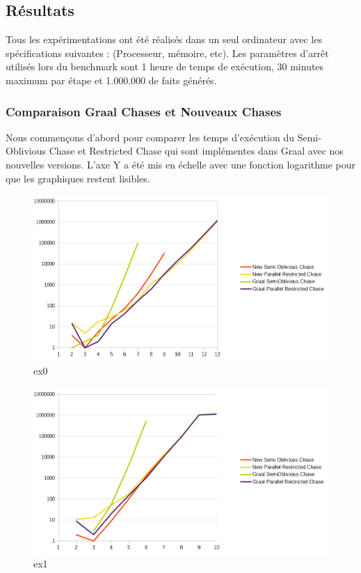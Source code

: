 \subsection{Résultats}

Tous les expérimentations ont été réalisés dans un seul ordinateur avec les spécifications suivantes : (Processeur, mémoire, etc). Les paramètres d'arrêt utilisés lors du benchmark sont 1 heure de temps de exécution, 30 minutes maximum par étape et 1.000.000 de faits générés.

\subsubsection{Comparaison Graal Chases et Nouveaux Chases}

Nous commençons d'abord pour comparer les temps d'exécution du Semi-Oblivious Chase et Restricted Chase qui sont implémentes dans Graal avec nos nouvelles versions. L'axe Y a été mis en échelle avec une fonction logarithme pour que les graphiques restent lisibles.

\begin{figure}[H]
\centering
\includegraphics[width=\textwidth]{pictures/benchmark old-new/ex0oldnew.png}
\caption{ex0}
\label{fig:ex0oldnew}
\end{figure}

\begin{figure}
\centering
\includegraphics[width=\textwidth]{pictures/benchmark old-new/ex1oldnew.png}
\caption{ex1}
\label{fig:ex1oldnew}
\end{figure}

